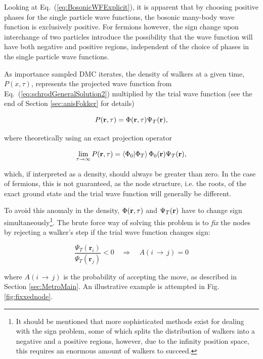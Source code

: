 Looking at Eq.~(\ref{eq:BosonicWFExplicit}), it is apparent that by choosing positive phases for the single particle wave functions, the bosonic many-body wave function is exclusively positive. For fermions however, the sign change upon interchange of two particles introduce the possibility that the wave function will have both negative and positive regions, independent of the choice of phases in the single particle wave functions.

As importance sampled DMC iterates, the density of walkers at a given time, $P(x, \tau)$, represents the projected wave function from Eq.~(\ref{eq:schrodGeneralSolution2}) multiplied by the trial wave function (see the end of Section \ref{sec:anisFokker} for details)

\begin{equation}
 P(\mathbf{r}, \tau) = \Phi(\mathbf{r}, \tau)\Psi_T(\mathbf{r}),
\end{equation}

where theoretically using an exact projection operator

\begin{equation}
  \lim_{\tau\to\infty} P(\mathbf{r}, \tau) = \left\langle \Phi_0 | \Phi_T\right\rangle\Phi_0(\mathbf{r})\Psi_T(\mathbf{r}),
\end{equation}

which, if interpreted as a density, should always be greater than zero. In the case of fermions, this is not guaranteed, as
the node structure, i.e. the roots, of the exact ground state and the trial wave function will generally be different.  

To avoid this anomaly in the density, $\Phi(\mathbf{r}, \tau)$ and $\Psi_T(\mathbf{r})$ have to change sign simultaneously\footnote{It should be mentioned that more sophisticated methods exist for dealing with the sign problem, some of which splits the distribution of walkers into a negative and a positive regions, however, due to the infinity position space, this requires an enormous amount of walkers to succeed.}. The brute force way of solving this problem is to \textit{fix} the nodes by rejecting a walker's step if the trial wave function changes sign:

\begin{equation}
\frac{\Psi_T(\mathbf{r}_i)}{\Psi_T(\mathbf{r}_j)} < 0 \quad\Longrightarrow\quad A(i\,\rightarrow\,j) = 0
\end{equation}

where $A(i\,\rightarrow\,j)$ is the probability of accepting the move, as described in Section \ref{sec:MetroMain}. An illustrative example is attempted in Fig. \ref{fig:fixxednode}.

